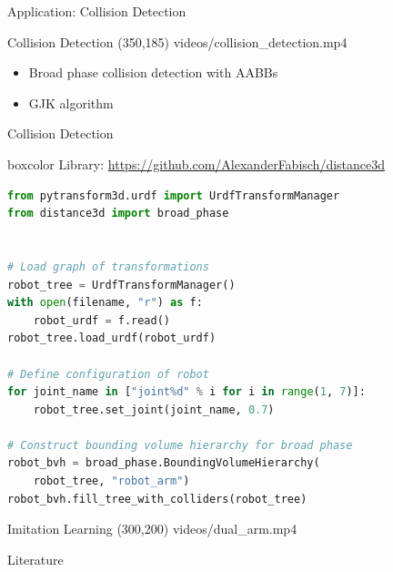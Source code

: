 \documentclass[14pt,aspectratio=169]{beamer}
\begin{document}
\begin{frame}
\begin{center}
\Large
Application: Collision Detection
\end{center}
\end{frame}

\begin{frame}{Collision Detection}
\makebox(350,185){
{videos/collision_detection.mp4}}
\begin{itemize}
\item Broad phase collision detection with AABBs
\item GJK algorithm \parencite{Gilbert1988}
\end{itemize}
\end{frame}

\begin{frame}[fragile]{Collision Detection}
\begin{beamercolorbox}[wd=\textwidth,sep=5pt]{boxcolor}
\centering
{\footnotesize Library:
\url{https://github.com/AlexanderFabisch/distance3d}}
\end{beamercolorbox}

\begin{lstlisting}[language=Python]
from pytransform3d.urdf import UrdfTransformManager
from distance3d import broad_phase


# Load graph of transformations
robot_tree = UrdfTransformManager()
with open(filename, "r") as f:
    robot_urdf = f.read()
robot_tree.load_urdf(robot_urdf)

# Define configuration of robot
for joint_name in ["joint%d" % i for i in range(1, 7)]:
    robot_tree.set_joint(joint_name, 0.7)

# Construct bounding volume hierarchy for broad phase
robot_bvh = broad_phase.BoundingVolumeHierarchy(
    robot_tree, "robot_arm")
robot_bvh.fill_tree_with_colliders(robot_tree)
\end{lstlisting}
\end{frame}

\begin{frame}[fragile]{Imitation Learning}
\makebox(300,200){
{videos/dual_arm.mp4}}
\end{frame}

\begin{frame}[t,allowframebreaks]{Literature}
\printbibliography[heading=none]
\end{frame}
\end{document}
